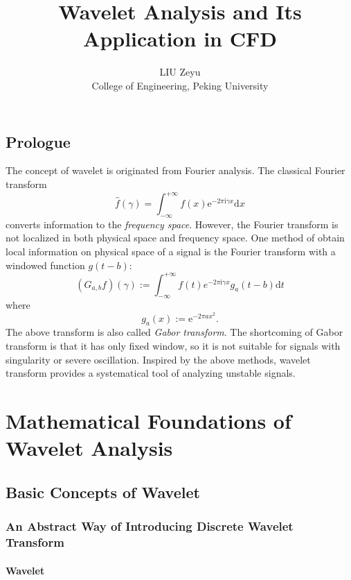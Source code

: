 \documentclass{book}
\newcommand{\assign}{:=}
\newcommand{\mathd}{\mathrm{d}}
\newcommand{\mathe}{\mathrm{e}}
\newcommand{\mathi}{\mathrm{i}}
\newcommand{\mathpi}{\pi}
\newcommand{\tmaffiliation}[1]{\\ #1}
\newcommand{\tmsamp}[1]{\textsf{#1}}
\newcommand{\tmtextit}[1]{{\itshape{#1}}}
\begin{document}
\title{Wavelet Analysis and Its Application in CFD}

\author{
  LIU Zeyu
  \tmaffiliation{College of Engineering, Peking University{\tmsamp{}}}
}

\maketitle

\chapter*{Prologue}

The concept of wavelet is originated from Fourier analysis. The classical
Fourier transform
\begin{equation}
  \hat{f} (\gamma) = \int_{- \infty}^{+ \infty} f (x) \mathe^{- 2 \mathpi
  \mathi \gamma x} \mathd x \label{FourierTrans}
\end{equation}
converts information to the \tmtextit{frequency space}. However, the Fourier
transform is not localized in both physical space and frequency space. One
method of obtain local information on physical space of a signal is the
Fourier transform with a windowed function $g (t - b)$:
\[ (G_{a, b} f) (\gamma) \assign \int_{- \infty}^{+ \infty} f (t) e^{- 2
   \mathpi \mathi \gamma x} g_a (t - b) \mathd t \]
where
\[ g_a (x) \assign \mathe^{- 2 \mathpi a x^2} . \]
The above transform is also called \tmtextit{Gabor transform}. The shortcoming
of Gabor transform is that it has only fixed window, so it is not suitable for
signals with singularity or severe oscillation. Inspired by the above methods,
wavelet transform provides a systematical tool of analyzing unstable signals.

\part{Mathematical Foundations of Wavelet Analysis}

\chapter{Basic{} Concepts of Wavelet}

\section{An Abstract Way of Introducing Discrete Wavelet Transform}

\subsection{Wavelet}
\end{document}
